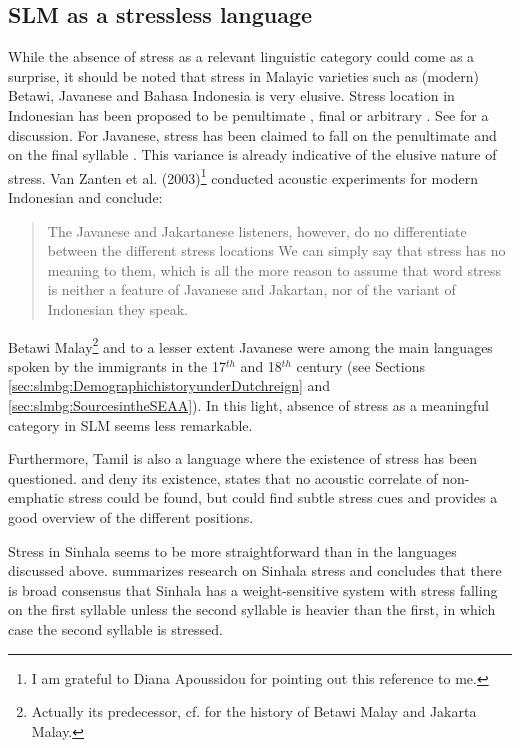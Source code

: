 \subsection{SLM as a stressless language}\label{sec:phon:SLMasastresslesslanguage}



While the absence of stress as a relevant linguistic category could come as a surprise, it should be noted that stress in Malayic varieties such as (modern) Betawi, Javanese and Bahasa Indonesia is very elusive. Stress location in Indonesian has been proposed to be penultimate \citep{Teeuw1984, AlievaEtAl1991}, final \citep{Samsuri1971} or  arbitrary \citep{Zubkova1966,Halim1974}. See \citet{Ode1994} for a discussion. For Javanese, stress has been claimed to fall on the penultimate \citep{Ras1982} and on the final syllable \citep{Poedjoesoedarmo1982}. This variance is already indicative of the elusive nature of stress. Van Zanten et al. (2003)\nocite{vanZantenEtAl2003}\footnote{I am grateful to Diana Apoussidou for pointing out this reference to me.} conducted acoustic experiments for modern Indonesian and conclude:

\begin{quote}
	The Javanese and Jakartanese listeners, however, do no differentiate between the different stress locations \el We can simply say that stress has no meaning to them, which is all the  more reason to assume that word stress is neither a feature of Javanese and Jakartan, nor of the variant of Indonesian they speak. \citep[169]{vanZantenEtAl2003}
\end{quote}

Betawi Malay\footnote{Actually its predecessor, cf. \citet{Grijns1991} for the history of Betawi Malay and Jakarta Malay.} and to a lesser extent Javanese were among the main languages spoken by the immigrants in the 17$^{th}$ and 18$^{th}$ century (see Sections \ref{sec:slmbg:DemographichistoryunderDutchreign} and \ref{sec:slmbg:SourcesintheSEAA}). In this light, absence of stress as a meaningful category in SLM seems less remarkable.

Furthermore, Tamil is also a language where the existence of stress has been questioned. \citet{Pope1867,Arden1934} and \citet{Arokianathan1981} deny its existence, \citet{Balasubramanian1980} states that no acoustic correlate of non-emphatic stress could be found, but \citet{Keane2001} could find subtle stress cues and provides a good overview of the different positions.

Stress in Sinhala  seems to be more straightforward than in the languages discussed above. \citet{Letterman1997}  summarizes research on Sinhala stress and concludes that there is broad consensus that Sinhala has a weight-sensitive system with stress falling on the first syllable unless the second syllable  is heavier than the first, in which case the second syllable is stressed.


